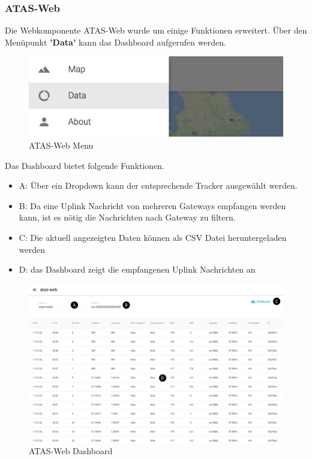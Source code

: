 \documentclass[11pt,english,german]{report}
\theoremstyle{definition}
\begin{document}
\subsubsection{ATAS-Web}
Die Webkomponente ATAS-Web wurde um einige Funktionen erweitert. Über den Menüpunkt \textbf{'Data'} kann das Dashboard aufgerufen werden.
\begin{figure}[H]
	\centering
	\includegraphics[width=\textwidth]{img/testing/atasweb_menu.jpg}
	\caption[ATAS-Web Menu]
	{ATAS-Web Menu}
\end{figure}

\newpage
\noindent
Das Dashboard bietet folgende Funktionen.
\begin{itemize}
	\item A: Über ein Dropdown kann der entsprechende Tracker ausgewählt werden.
	\item B: Da eine Uplink Nachricht von mehreren Gateways empfangen werden kann, ist es nötig die Nachrichten nach Gateway zu filtern.
	\item C: Die aktuell angezeigten Daten können als CSV Datei heruntergeladen werden
	\item D: das Dashboard zeigt die empfangenen Uplink Nachrichten an  
\end{itemize}
\begin{figure}[H]
	\centering
	\includegraphics[width=\textwidth]{img/testing/atasweb_data.jpg}
	\caption[ATAS-Web Dashboard]
	{ATAS-Web Dashboard}
\end{figure}
\end{document}
